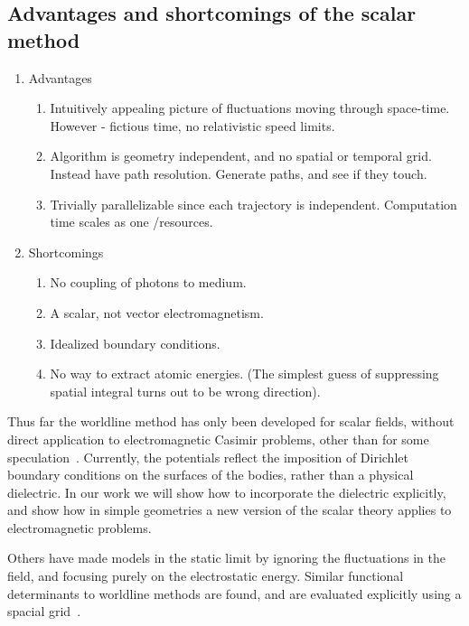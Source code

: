   \subsection{Advantages and shortcomings of the scalar method}
\begin{enumerate}
  \item Advantages

  \begin{enumerate}
    \item Intuitively appealing picture of fluctuations moving through space-time.
      However - fictious time, no relativistic speed limits.  
    \item Algorithm is geometry independent, and no spatial or temporal grid.
      Instead have path resolution.  
      Generate paths, and see if they touch.
  \item Trivially parallelizable since each trajectory is independent. 
      Computation time scales as one /resources.  
  \end{enumerate}

  \item Shortcomings
    \begin{enumerate}
      \item No coupling of photons to medium.
      \item A scalar, not vector electromagnetism.
      \item Idealized boundary conditions.  
      \item No way to extract atomic energies.  (The simplest guess of suppressing spatial integral turns 
        out to be wrong direction).
    \end{enumerate}
\end{enumerate}

Thus far the worldline method has only been developed for scalar fields, 
without direct application to electromagnetic Casimir problems, 
other than for some speculation~\cite{Aehlig2011}.
  Currently, the potentials reflect the imposition of Dirichlet boundary 
conditions on the surfaces of the bodies, rather than a physical dielectric.
   In our work we will show how to incorporate the dielectric explicitly, 
and show how in simple geometries a new version of the scalar theory applies
 to electromagnetic problems.  

Others have made models in the static limit by ignoring the fluctuations in the field,
and focusing purely on the electrostatic energy.
 Similar functional determinants to worldline methods are found,
 and are evaluated explicitly using a spacial grid~\cite{Pasquali2008}.  

